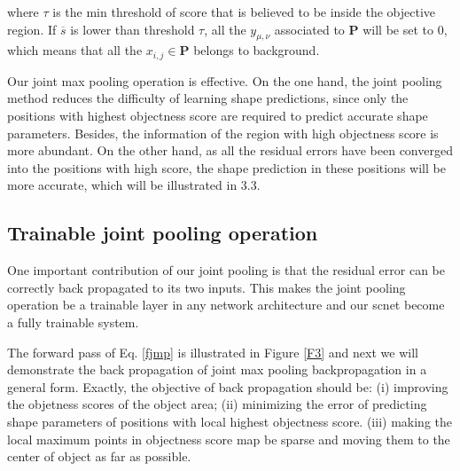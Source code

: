 \documentclass[10pt,twocolumn,letterpaper]{article}
\begin{document}
where $\tau$ is the min threshold of score that is believed to be inside the objective region.
If $\overline{s}$ is lower than threshold $\tau$, all the $y_{\mu,\nu}$ associated to $\mathbf{P}$ will be set to $0$, which means that all the $x_{i,j}\in\mathbf{P}$ belongs to background.

Our joint max pooling operation is effective.
On the one hand, the joint pooling method reduces the difficulty of learning shape predictions, since only the positions with highest objectness score are required to predict accurate shape parameters.
Besides, the information of the region with high objectness score is more abundant.
On the other hand, as all the residual errors have been converged into the positions with high score, the shape prediction in these positions will be more accurate, which will be illustrated in 3.3.

\subsection{Trainable joint pooling operation}
One important contribution of our joint pooling is that the residual error can be correctly back propagated to its two inputs.
This makes the joint pooling operation be a trainable layer in any network architecture and our scnet become a fully trainable system.

The forward pass of Eq. \ref{fjmp} is illustrated in Figure \ref{F3} and next we will demonstrate the back propagation of joint max pooling backpropagation in a general form.
Exactly, the objective of back propagation should be:
(i) improving the objetness scores of the object area;
(ii) minimizing the error of predicting shape parameters of positions with local highest objectness score.
(iii) making the local maximum points in objectness score map be sparse and moving them to the center of object as far as possible.
\end{document}
